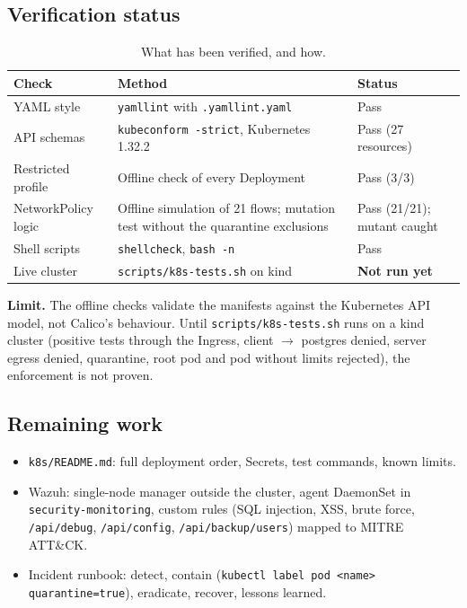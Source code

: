\documentclass[11pt,a4paper]{article}
\newcommand{\thc}[1]{\textcolor{headtxt}{\textbf{#1}}}
\begin{document}
\subsection{Verification status}
\begin{table}[H]
\centering
\caption{What has been verified, and how.}
\label{tab:k8stests}
\begin{tabularx}{\textwidth}{@{}l Y l@{}}
\toprule
{}\thc{Check} & \thc{Method} & \thc{Status} \\
\midrule
YAML style & \texttt{yamllint} with \texttt{.yamllint.yaml} & Pass \\
API schemas & \texttt{kubeconform -strict}, Kubernetes 1.32.2 & Pass (27 resources) \\
Restricted profile & Offline check of every Deployment & Pass (3/3) \\
NetworkPolicy logic & Offline simulation of 21 flows; mutation test without the quarantine exclusions & Pass (21/21); mutant caught \\
Shell scripts & \texttt{shellcheck}, \texttt{bash -n} & Pass \\
Live cluster & \texttt{scripts/k8s-tests.sh} on kind & \textbf{\color{amb}Not run yet} \\
\bottomrule
\end{tabularx}
\end{table}

\begin{tcolorbox}[colback=notebg,colframe=amb,leftrule=3pt,boxrule=0.3pt,arc=2pt,left=8pt,right=8pt]
\textbf{\color{amb}Limit.} The offline checks validate the manifests against the Kubernetes API model, not Calico's behaviour.
Until \texttt{scripts/k8s-tests.sh} runs on a kind cluster (positive tests through the Ingress, client $\rightarrow$ postgres denied, server egress denied, quarantine, root pod and pod without limits rejected), the enforcement is not proven.
\end{tcolorbox}

\subsection{Remaining work}
\begin{itemize}
  \item \texttt{k8s/README.md}: full deployment order, Secrets, test commands, known limits.
  \item Wazuh: single-node manager outside the cluster, agent DaemonSet in \texttt{security-monitoring}, custom rules (SQL injection, XSS, brute force, \texttt{/api/debug}, \texttt{/api/config}, \texttt{/api/backup/users}) mapped to MITRE ATT\&CK.
  \item Incident runbook: detect, contain (\texttt{kubectl label pod <name> quarantine=true}), eradicate, recover, lessons learned.
\end{itemize}
\end{document}
